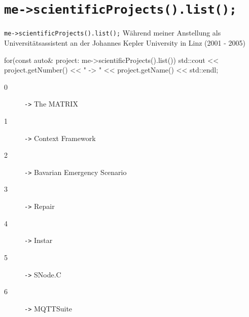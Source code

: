 ﻿\nopartpage
\part{\tt{me->scientificProjects().list();}}
\withpartpage

\begin{frame}[t, fragile]{\tt{me->scientificProjects().list();}}
\vspace*{0.5em}%
Während meiner Anstellung als Universitätsassistent an der \alert{Johannes Kepler University} in Linz (2001 - 2005)
  \begin{cppcode}[autogobble=true,captionpos=b,morekeywords={[2]project}]
    for(const auto& project: me->scientificProjects().list()) {
      std::cout << project.getNumber() << " -> " << project.getName() << std::endl;
    }
  \end{cppcode}
  \begin{description}
    \item[0] {\texttt{->}} The MATRIX
    \item[1] {\texttt{->}} Context Framework
    \item[2] {\texttt{->}} Bavarian Emergency Scenario
    \item[3] {\texttt{->}} Repair
    \item[4] {\texttt{->}} Instar
    \item[5] {\texttt{->}} SNode.C
    \item[6] {\texttt{->}} MQTTSuite
  \end{description}
\end{frame}
